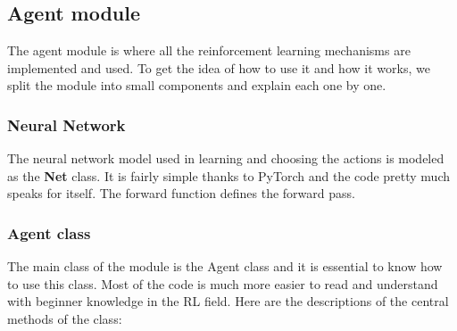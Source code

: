 \documentclass{article}
\begin{document}
\subsection{Agent module}
The agent module is where all the reinforcement learning mechanisms are implemented and used. To get the idea of how to use it and how it works, we split the module into small components and explain each one by one.
\subsubsection{Neural Network}
The neural network model used in learning and choosing the actions is modeled as the \textbf{Net} class. It is fairly simple thanks to PyTorch and the code pretty much speaks for itself. The forward function defines the forward pass.

\subsubsection{Agent class}
The main class of the module is the Agent class and it is essential to know how to use this class. Most of the code is much more easier to read and understand with beginner knowledge in the RL field. Here are the descriptions of the central methods of the class:
\end{document}
